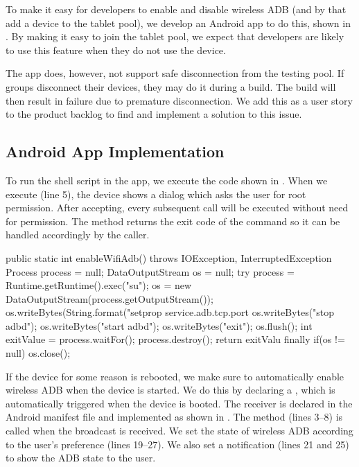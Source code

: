 To make it easy for developers to enable and disable wireless ADB (and by that add a device to the tablet pool), we develop an Android app to do this, shown in . By making it easy to join the tablet pool, we expect that developers are likely to use this feature when they do not use the device.

The app does, however, not support safe disconnection from the testing pool. If groups disconnect their devices, they may do it during a build. The build will then result in failure due to premature disconnection. We add this as a user story to the product backlog to find and implement a solution to this issue. 


\subsection{Android App Implementation}
To run the shell script in the app, we execute the code shown in . When we execute  (line 5), the device shows a dialog which asks the user for root permission. After accepting, every subsequent  call will be executed without need for permission. The method returns the exit code of the command so it can be handled accordingly by the caller.
\begin{javacode}[float,label=lst:android_app_shell,caption=Enable wireless ADB in Android]
public static int enableWifiAdb() throws IOException, InterruptedException {
  Process process = null;
  DataOutputStream os = null;
  try {
    process = Runtime.getRuntime().exec("su");
    os = new DataOutputStream(process.getOutputStream());
    os.writeBytes(String.format("setprop service.adb.tcp.port %
    os.writeBytes("stop adbd\n");
    os.writeBytes("start adbd\n");
    os.writeBytes("exit\n");
    os.flush();
    int exitValue = process.waitFor();
    process.destroy();
    return exitValu
  } finally {
    if(os != null) {
      os.close();
    }
  }
}
\end{javacode}
If the device for some reason is rebooted, we make sure to automatically enable wireless ADB when the device is started. We do this by declaring a , which is automatically triggered when the device is booted. The receiver is declared in the Android manifest file and implemented as shown in . The  method (lines 3--8) is called when the broadcast is received. We set the state of wireless ADB according to the user's preference (lines 19--27). We also set a notification (lines 21 and 25) to show the ADB state to the user.

